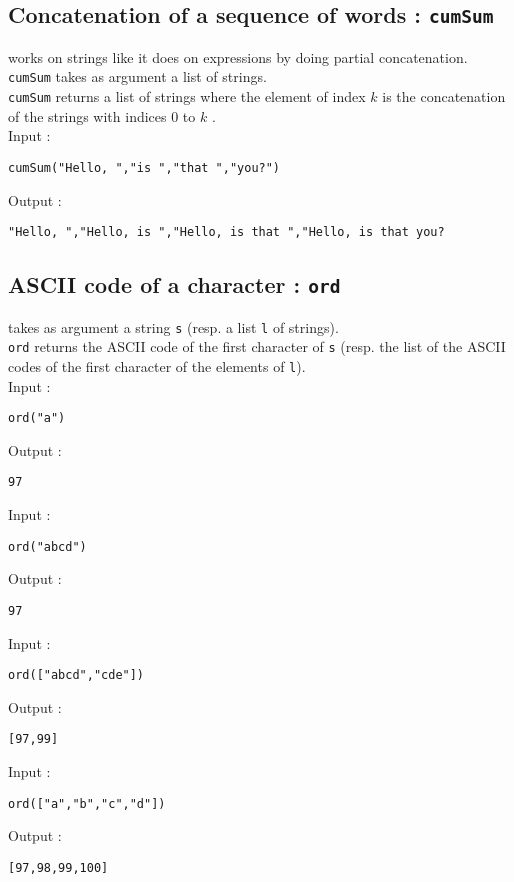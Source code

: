 \documentclass[a4paper,11pt]{book}
\begin{document}
\subsection{Concatenation of a sequence of words : {\tt cumSum}}
 works on strings like it does on expressions by
doing partial concatenation.\\
{\tt cumSum} takes as argument a list of strings.\\
{\tt cumSum} returns a list of strings where the element of index $k$ is the
concatenation of the strings with indices 0 to $k$ .\\
Input :
\begin{center}{\tt cumSum("Hello, ","is ","that ","you?")}\end{center}
Output :
\begin{center}{\tt "Hello, ","Hello, is ","Hello, is that ","Hello, is that you?}\end{center}

\subsection{ASCII code of a character : {\tt ord}}
 takes as argument a string {\tt s} (resp. 
a list {\tt l} of 
strings).\\
{\tt ord} returns the ASCII code of the first character of {\tt s} (resp. the 
list of the ASCII codes of the first character of the elements of {\tt l}).\\
Input :
\begin{center}{\tt ord("a")}\end{center}
Output :
\begin{center}{\tt 97}\end{center}
Input :
\begin{center}{\tt ord("abcd")}\end{center}
Output :
\begin{center}{\tt 97}\end{center} 
Input :
\begin{center}{\tt ord(["abcd","cde"])}\end{center}
Output :
\begin{center}{\tt [97,99]}\end{center} 
Input :
\begin{center}{\tt ord(["a","b","c","d"])}\end{center}
Output :
\begin{center}{\tt [97,98,99,100]}\end{center} 
\end{document}
